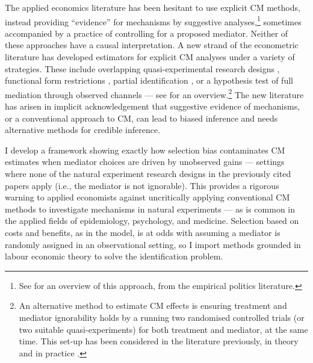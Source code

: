 The applied economics literature has been hesitant to use explicit CM methods, instead providing ``evidence'' for mechanisms by suggestive analyses,\footnote{
    See \cite{blackwell2024assumption} for an overview of this approach, from the empirical politics literature.
} sometimes accompanied by a practice of controlling for a proposed mediator.
Neither of these approaches have a causal interpretation.
A new strand of the econometric literature has developed estimators for explicit CM analyses under a variety of strategies.
These include overlapping quasi-experimental research designs \citep{deuchert2019direct,frolich2017direct}, functional form restrictions \citep{heckman2015econometric}, partial identification \citep{flores2009identification}, or a hypothesis test of full mediation through observed channels \citep{kwon2024testing} --- see \cite{huber2019review} for an overview.\footnote{
    An alternative method to estimate CM effects is ensuring treatment and mediator ignorability holds by a running two randomised controlled trials (or two suitable quasi-experiments) for both treatment and mediator, at the same time.
    This set-up has been considered in the literature previously, in theory \citep{imai2013experimental,heckman2015econometric} and in practice \citep{ludwig2011mechanism,heckman2013understanding}.
}
The new literature has arisen in implicit acknowledgement that suggestive evidence of mechanisms, or a conventional approach to CM, can lead to biased inference and needs alternative methods for credible inference.

I develop a framework showing exactly how selection bias contaminates CM estimates when mediator choices are driven by unobserved gains --- settings where none of the natural experiment research designs in the previously cited papers apply (i.e., the mediator is not ignorable).
This provides a rigorous warning to applied economists against uncritically applying conventional CM methods to investigate mechanisms in natural experiments --- as is common in the applied fields of epidemiology, psychology, and medicine.
Selection based on costs and benefits, as in the \cite{roy1951some} model, is at odds with assuming a mediator is randomly assigned in an observational setting, so I import methods grounded in labour economic theory to solve the identification problem.


